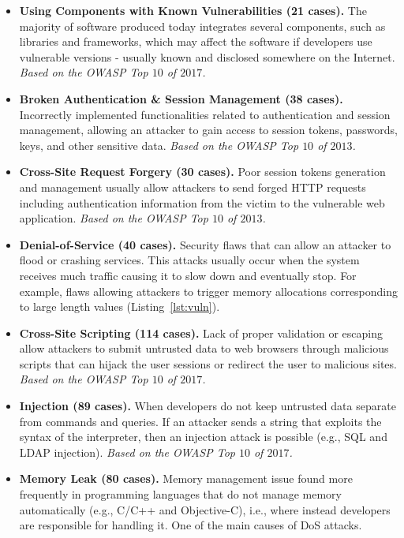 \documentclass[10pt,conference]{IEEEtran}
\begin{document}
\begin{itemize}
    \item \textbf{Using Components with Known Vulnerabilities (21 cases).} The majority of
    software produced today integrates several components, such as libraries and
    frameworks, which may affect the software if developers use vulnerable
    versions - usually known and disclosed somewhere on the Internet.
    \textit{Based on the OWASP Top $10$ of $2017$.}

    \item \textbf{Broken Authentication \& Session Management (38 cases).} Incorrectly
    implemented functionalities related to authentication and session
    management, allowing an attacker to gain access to session tokens,
    passwords, keys, and other sensitive data. \textit{Based on the OWASP Top
    $10$ of $2013$.}

    \item \textbf{Cross-Site Request Forgery (30 cases).} Poor session tokens generation
    and management usually allow attackers to send forged HTTP requests
    including authentication information from the victim to the vulnerable web
    application. \textit{Based on the OWASP Top $10$ of $2013$.}

    \item \textbf{Denial-of-Service (40 cases).} Security flaws that can allow an attacker
    to flood or crashing services. This attacks usually occur when the system
    receives much traffic causing it to slow down and eventually stop. For
    example, flaws allowing attackers to trigger memory allocations
    corresponding to large length values (Listing~\ref{lst:vuln}).

    \item \textbf{Cross-Site Scripting (114 cases).} Lack of proper validation or escaping
    allow attackers to submit untrusted data to web browsers through malicious
    scripts that can hijack the user sessions or redirect the user to malicious
    sites. \textit{Based on the OWASP Top $10$ of $2017$.}

    \item \textbf{Injection (89 cases).} When developers do not keep untrusted data
    separate from commands and queries. If an attacker sends a string that
    exploits the syntax of the interpreter, then an injection attack is possible
    (e.g., SQL and LDAP injection). \textit{Based on the OWASP Top $10$ of
    $2017$.}

    \item \textbf{Memory Leak (80 cases).} Memory management issue found more frequently in
    programming languages that do not manage memory automatically (e.g., C/C++
    and Objective-C), i.e., where instead developers are responsible for
    handling it. One of the main causes of DoS attacks.


\end{itemize}
\end{document}
